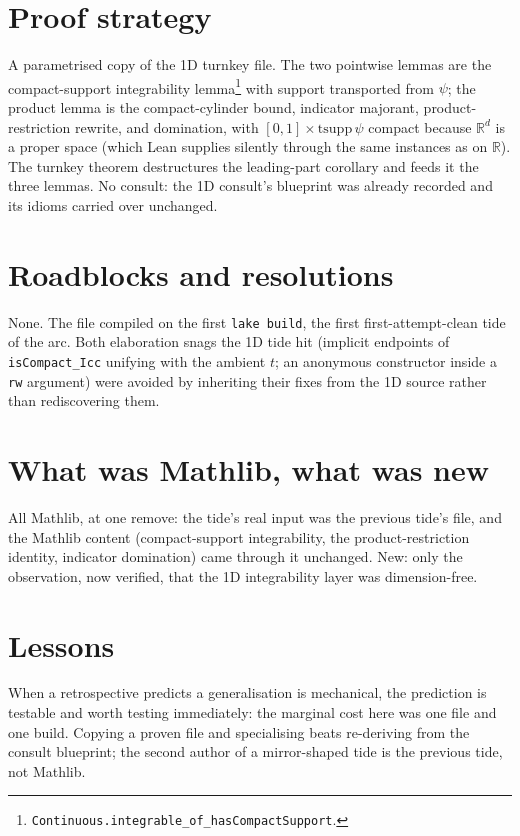 \documentclass[11pt]{article}
\begin{document}
\section{Proof strategy}

A parametrised copy of the 1D turnkey file. The two pointwise lemmas are
the compact-support integrability lemma\footnote{%
\texttt{Continuous.integrable\_of\_hasCompactSupport}.} with support
transported from $\psi$; the product lemma is the compact-cylinder bound,
indicator majorant, product-restriction rewrite, and domination, with
$[0,1] \times \mathrm{tsupp}\,\psi$ compact because $\mathbb{R}^d$ is a
proper space (which Lean supplies silently through the same instances as
on $\mathbb{R}$). The turnkey theorem destructures the leading-part
corollary and feeds it the three lemmas. No consult: the 1D consult's
blueprint was already recorded and its idioms carried over unchanged.

\section{Roadblocks and resolutions}

None. The file compiled on the first \texttt{lake build}, the first
first-attempt-clean tide of the arc. Both elaboration snags the 1D tide
hit (implicit endpoints of \texttt{isCompact\_Icc} unifying with the
ambient $t$; an anonymous constructor inside a \texttt{rw} argument) were
avoided by inheriting their fixes from the 1D source rather than
rediscovering them.

\section{What was Mathlib, what was new}

All Mathlib, at one remove: the tide's real input was the previous tide's
file, and the Mathlib content (compact-support integrability, the
product-restriction identity, indicator domination) came through it
unchanged. New: only the observation, now verified, that the 1D
integrability layer was dimension-free.

\section{Lessons}

When a retrospective predicts a generalisation is mechanical, the
prediction is testable and worth testing immediately: the marginal cost
here was one file and one build. Copying a proven file and specialising
beats re-deriving from the consult blueprint; the second author of a
mirror-shaped tide is the previous tide, not Mathlib.
\end{document}
